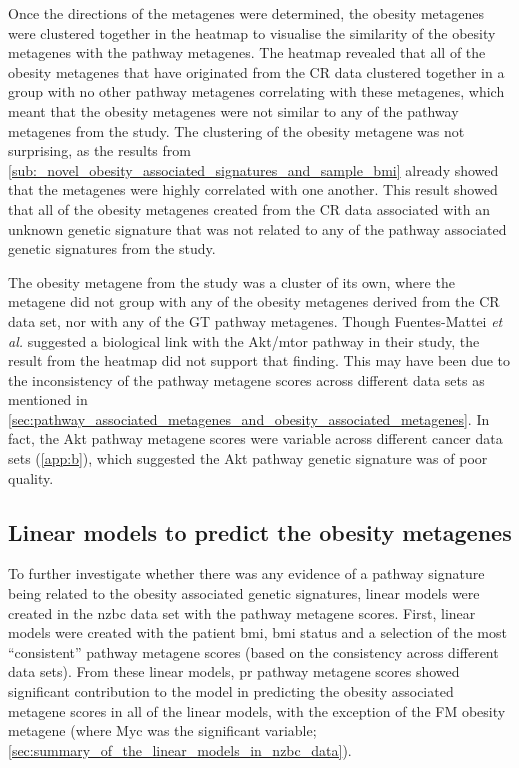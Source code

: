 Once the directions of the metagenes were determined, the obesity metagenes were clustered together in the heatmap to visualise the similarity of the obesity metagenes with the pathway metagenes.
The heatmap revealed that all of the obesity metagenes that have originated from the CR data clustered together in a group with no other pathway metagenes correlating with these metagenes, which meant that the obesity metagenes were not similar to any of the pathway metagenes from the \citet{Gatza2010a} study.
The clustering of the obesity metagene was not surprising, as the results from \cref{sub:_novel_obesity_associated_signatures_and_sample_bmi} already showed that the metagenes were highly correlated with one another.
This result showed that all of the obesity metagenes created from the CR data associated with an unknown genetic signature that was not related to any of the pathway associated genetic signatures from the \citet{Gatza2010a} study.

The obesity metagene from the \citet{Fuentes-Mattei2014} study was a cluster of its own, where the metagene did not group with any of the obesity metagenes derived from the CR data set, nor with any of the GT pathway metagenes.
Though Fuentes-Mattei \textit{et al.} suggested a biological link with the Akt/\gls{mtor} pathway in their study, the result from the heatmap did not support that finding.
This may have been due to the inconsistency of the pathway metagene scores across different data sets as mentioned in \cref{sec:pathway_associated_metagenes_and_obesity_associated_metagenes}.
In fact, the Akt pathway metagene scores were variable across different cancer data sets (\cref{app:b}), which suggested the Akt pathway genetic signature was of poor quality.

\subsection{Linear models to predict the obesity metagenes}
\label{sub:linear_models_to_predict_obesity_metagenes}

To further investigate whether there was any evidence of a pathway signature being related to the obesity associated genetic signatures, linear models were created in the \gls{nzbc} data set with the pathway metagene scores.
First, linear models were created with the patient \gls{bmi}, \gls{bmi} status and a selection of the most ``consistent'' pathway metagene scores (based on the consistency across different data sets).
From these linear models, \gls{pr} pathway metagene scores showed significant contribution to the model in predicting the obesity associated metagene scores in all of the linear models, with the exception of the FM obesity metagene (where Myc was the significant variable; \cref{sec:summary_of_the_linear_models_in_nzbc_data}).

